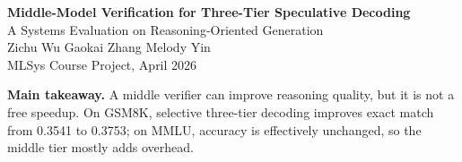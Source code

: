 \documentclass[landscape]{article}
\newcommand{\posterbox}[1]{%
  \vspace{0.12in}
  \noindent\colorbox{soft}{%
    \begin{minipage}{0.96\linewidth}
    \vspace{0.15in}
    #1
    \vspace{0.15in}
    \end{minipage}}
  \vspace{0.12in}
}
\begin{document}
\color{ink}

\begin{center}
{\fontsize{56}{62}\selectfont\bfseries Middle-Model Verification for Three-Tier Speculative Decoding}\\[0.15in]
{\fontsize{32}{38}\selectfont A Systems Evaluation on Reasoning-Oriented Generation}\\[0.12in]
{\LARGE Zichu Wu \quad Gaokai Zhang \quad Melody Yin}\\[0.06in]
{\Large MLSys Course Project, April 2026}
\end{center}

\vspace{0.18in}

\posterbox{
{\Huge\bfseries Main takeaway.}
{\Huge A middle verifier can improve reasoning quality, but it is not a free speedup. On GSM8K, selective three-tier decoding improves exact match from 0.3541 to 0.3753; on MMLU, accuracy is effectively unchanged, so the middle tier mostly adds overhead.}
}
\end{document}
